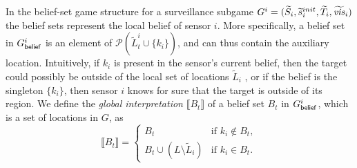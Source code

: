 In the belief-set game structure for a surveillance subgame $G^{i} = (\widetilde{S}_i,\widetilde{s}_i^{init},\widetilde{T}_i,\widetilde{\mathit{vis}}_i)$ the belief sets represent the local belief of sensor $i$. More specifically, a belief set in $G^{i}_{\mathsf{belief}}$ is an element of  $\mathcal{P}(\widetilde{L}^i_t \cup \{k_i\})$, and can thus contain the auxiliary location. Intuitively, if $ k_i$ is present in the sensor's current belief, then the target could possibly be outside of the local set of locations $\widetilde L_i$ , or if the belief is the singleton $\{k_i\}$, then sensor $i$ knows for sure that the target is outside of its region.  
We define the \emph{global interpretation} $\llbracket B_t\rrbracket$ of a belief set $B_t$ in $G^{i}_{\mathsf{belief}}$, which is a set of locations in $G$, as
 \[\llbracket B_t\rrbracket = \begin{cases}
B_t & \text{if } k_i \not\in B_t, \\
B_t \cup (L \setminus \widetilde L_i) & \text{if } k_i  \in B_t.
\end{cases}
\]



